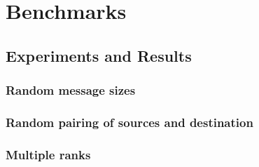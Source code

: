 \section{Benchmarks}









\subsection{Experiments and Results}

\subsubsection {Random message sizes}


\subsubsection {Random pairing of sources and destination}

\subsubsection {Multiple ranks}


